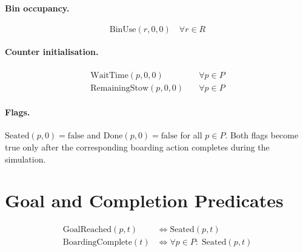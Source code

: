 \documentclass[11pt,a4paper]{article}
\begin{document}
\paragraph{Bin occupancy.}
\begin{equation}
  \text{BinUse}(r,0,0) \quad \forall r \in R
\end{equation}

\paragraph{Counter initialisation.}
\begin{align}
  \text{WaitTime}(p,0,0) &\quad \forall p \in P \\
  \text{RemainingStow}(p,0,0) &\quad \forall p \in P
\end{align}

\paragraph{Flags.}
$\text{Seated}(p,0) = \text{false}$ and $\text{Done}(p,0) = \text{false}$ for all $p \in P$.
Both flags become true only after the corresponding boarding action completes during the simulation.

\section{Goal and Completion Predicates}

\begin{align}
  \text{GoalReached}(p,t)    &\iff \text{Seated}(p,t) \label{eq:goal}\\[4pt]
  \text{BoardingComplete}(t) &\iff \forall p \in P:\; \text{Seated}(p,t) \label{eq:complete}
\end{align}
\end{document}
